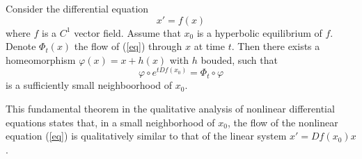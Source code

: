 \documentclass[12pt]{article}
\begin{document}
Consider the differential equation
\begin{equation}
x'=f(x)
\label{eq}
\end{equation}
where $f$ is a $C^1$ vector field. Assume that $x_0$ is a hyperbolic equilibrium of $f$. Denote $\Phi_t(x)$ the flow of (\ref{eq}) through $x$ at time $t$. Then there exists a homeomorphism $\varphi(x)=x+h(x)$ with $h$ bouded, such that
\[
\varphi\circ e^{tDf(x_0)}=\Phi_t\circ\varphi
\]
is a sufficiently small neighboorhood of $x_0$.

This fundamental theorem in the qualitative analysis of nonlinear differential equations states that, in a small neighborhood of $x_0$, the flow of the nonlinear equation (\ref{eq}) is qualitatively similar to that of the linear system $x'=Df(x_0)x$.
\end{document}
